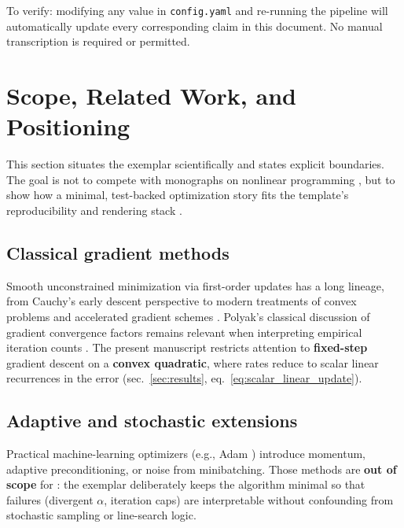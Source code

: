 \documentclass[
]{article}
\begin{document}
To verify: modifying any value in \texttt{config.yaml} and re-running
the pipeline will automatically update every corresponding claim in this
document. No manual transcription is required or permitted.

\newpage

\section{Scope, Related Work, and Positioning}\label{sec:scope}

This section situates the exemplar scientifically and states explicit
boundaries. The goal is not to compete with monographs on nonlinear
programming \citep{nocedal2006numerical, bertsekas1999nonlinear}, but to
show how a minimal, test-backed optimization story fits the template's
reproducibility and rendering stack \citep{peng2011reproducible}.

\subsection{Classical gradient
methods}\label{classical-gradient-methods}

Smooth unconstrained minimization via first-order updates has a long
lineage, from Cauchy's early descent perspective
\citep{cauchy1847methode} to modern treatments of convex problems
\citep{boyd2004convex} and accelerated gradient schemes
\citep{nesterov2013gradient}. Polyak's classical discussion of gradient
convergence factors remains relevant when interpreting empirical
iteration counts \citep{polyak1964some}. The present manuscript
restricts attention to \textbf{fixed-step} gradient descent on a
\textbf{convex quadratic}, where rates reduce to scalar linear
recurrences in the error (sec.~\ref{sec:results},
eq.~\ref{eq:scalar_linear_update}).

\subsection{Adaptive and stochastic
extensions}\label{adaptive-and-stochastic-extensions}

Practical machine-learning optimizers (e.g., Adam
\citep{kingma2014adam}) introduce momentum, adaptive preconditioning, or
noise from minibatching. Those methods are \textbf{out of scope} for
: the exemplar deliberately keeps the
algorithm minimal so that failures (divergent \(\alpha\), iteration
caps) are interpretable without confounding from stochastic sampling or
line-search logic.
\end{document}
